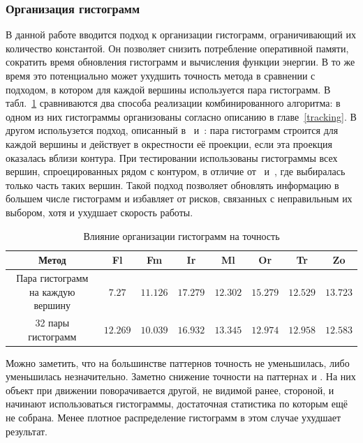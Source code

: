 \subsubsection{Организация гистограмм}

В данной работе вводится подход к организации гистограмм, ограничивающий их
количество константой.
Он позволяет снизить потребление оперативной памяти, сократить время обновления гистограмм и вычисления функции энергии.
В то же время это потенциально может ухудшить точность метода в сравнении с
подходом, в котором для каждой вершины используется пара гистограмм.
В табл.~\ref{tab:full_hist} сравниваются два способа реализации
комбинированного алгоритма: в одном из них гистограммы организованы согласно
описанию в главе~\ref{tracking}.
В другом испольузется подход, описанный в~\cite{Tjaden2017}
и~\cite{Tjaden2018}: пара гистограмм строится для каждой вершины и действует в
окрестности её проекции, если эта проекция оказалась вблизи контура.
При тестировании использованы гистограммы всех вершин, спроецированных рядом
с контуром, в отличие от~\cite{Tjaden2017} и~\cite{Tjaden2018}, где выбиралась
только часть таких вершин.
Такой подход позволяет обновлять информацию в большем числе гистограмм и
избавляет от рисков, связанных с неправильным их выбором, хотя и ухудшает
скорость работы.

\begin{table}[h]
\caption{\label{tab:full_hist}Влияние организации гистограмм на точность}
\begin{center}
\begin{tabular}{|c|c|c|c|c|c|c|c|}
\hline
Метод & Fl & Fm & Ir & Ml & Or & Tr & Zo \\
\hline
Пара гистограмм на каждую вершину & $7.27$ & $\mathbf{11.126}$ &
$\mathbf{17.279}$ & $12.302$ & $\mathbf{15.279}$ & $12.529$ &
$\mathbf{13.723}$\\
\hline
32 пары гистограмм & $\mathbf{12.269}$ & $10.039$ & $16.932$ &
$\mathbf{13.345}$ & $12.974$ &
$\mathbf{12.958}$ & $12.583$ \\
\hline
\end{tabular}
\end{center}
\end{table}

Можно заметить, что на большинстве паттернов  точность не уменьшилась, либо
уменьшилась незначительно.
Заметно снижение точности на паттернах  и .
На них объект при движении поворачивается другой, не видимой ранее, стороной, и
начинают использоваться гистограммы, достаточная статистика по которым ещё не
собрана.
Менее плотное распределение гистограмм в этом случае ухудшает результат.

